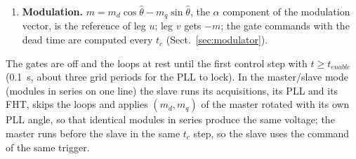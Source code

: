 \documentclass[10pt,a4paper]{scrartcl}
\newcommand{\tc}{t_c}
\begin{document}
\begin{onehalfspace}
\begin{enumerate}
\item \textbf{Modulation.} $m = m_d\cos\hat\theta - m_q\sin\hat\theta$, the $\alpha$ component of the modulation vector, is the reference of leg $u$; leg $v$ gets $-m$; the gate commands with the dead time are computed every $\tc$ (Sect.~\ref{sec:modulator}).
\end{enumerate}
The gates are off and the loops at rest until the first control step with $t \ge t_{enable}$ (\SI{0.1}{s}, about three grid periods for the PLL to lock). In the master/slave mode (modules in series on one line) the slave runs its acquisitions, its PLL and its FHT, skips the loops and applies $(m_d, m_q)$ of the master rotated with its own PLL angle, so that identical modules in series produce the same voltage; the master runs before the slave in the same $\tc$ step, so the slave uses the command of the same trigger.


\end{onehalfspace}
\end{document}
